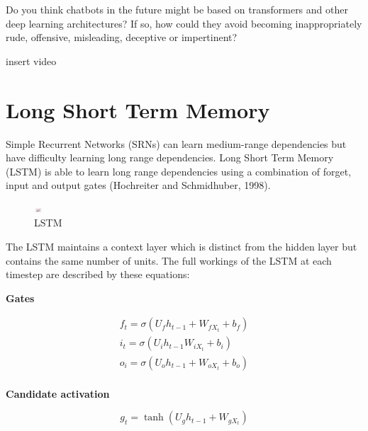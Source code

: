 \documentclass[11pt]{article}
\begin{document}
Do you think chatbots in the future might be based on transformers and other
deep learning architectures?
If so, how could they avoid becoming inappropriately rude, offensive,
misleading, deceptive or impertinent?

    insert video

\section{Long Short Term Memory}\label{sec:long-short-term-memory}

Simple Recurrent Networks (SRNs) can learn medium-range dependencies but have
difficulty learning long range dependencies.
Long Short Term Memory (LSTM) is able to learn long range dependencies using a
combination of forget, input and output gates (Hochreiter and Schmidhuber, 1998).

\begin{figure}[h]
    \centering
    \includegraphics[width=12,height=8]{../out/images/lstm}
    \caption[LSTM]{LSTM}
    \label{fig: LSTM}
\end{figure}

The LSTM maintains a context layer which is distinct from the hidden layer but
contains the same number of units.
The full workings of the LSTM at each timestep are described by these
equations:

\textbf{Gates}

\begin{gather*}
    f_t = \sigma (U_f h_{t-1} + W_{f X_t} + b_f)\\
    i_t = \sigma(U_i h_{t-1} W_{i X_t} + b_i)\\
    o_i = \sigma(U_o h_{t-1} + W_{o X_t} + b_o)\\
\end{gather*}

\textbf{Candidate activation}

\[g_t = \tanh (U_g h_{t-1} + W_{g X_t})\]
\end{document}
